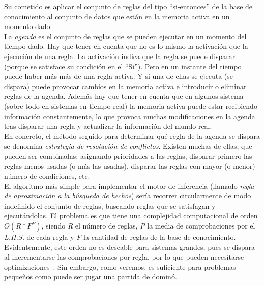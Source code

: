 Su cometido es aplicar el conjunto de reglas del tipo ``si-entonces''
de la base de conocimiento al conjunto de datos que están en la
memoria activa en un momento dado. \\

La \emph{agenda} es el conjunto de reglas que se pueden ejecutar en un
momento del tiempo dado. Hay que tener en cuenta que no es lo mismo la
activación que la ejecución de una regla. La activación indica que la
regla se puede disparar (porque se satisface su condición en el
``Si''). Pero en un instante del tiempo puede haber más más de una
regla activa. Y si una de ellas se ejecuta (se dispara) puede provocar
cambios en la memoria activa e introducir o eliminar reglas de la
agenda. Además hay que tener en cuenta que en algunos sistema (sobre
todo en sistemas en tiempo real) la memoria activa puede estar
recibiendo información constantemente, lo que provoca muchas
modificaciones en la agenda tras disparar una regla y actualizar la información del mundo real. \\

En concreto, el método seguido para determinar qué regla de la agenda
se dispara se denomina \emph{estrategia de resolución de
  conflictos}. Existen muchas de ellas, que pueden ser combinadas:
asignando prioridades a las reglas, disparar primero las reglas menos
usadas (o más las usadas), disparar las reglas con mayor (o menor)
número de condiciones, etc. \\

El algoritmo más simple para implementar el motor de inferencia
(llamado \emph{regla de aproximación a la búsqueda de hechos}) sería
recorrer circularmente de modo indefinido el conjunto de reglas,
buscando reglas que se satisfagan y ejecutándolas. El problema es que
tiene una complejidad computacional de orden $O(R*F^P)$, siendo
\emph{R} el número de reglas, \emph{P} la media de comprobaciones por
el \emph{L.H.S.} de cada regla y \emph{F} la cantidad de reglas de la
base de conocimiento. Evidentemente, este orden no es deseable para
sistemas grandes, pues se dispara al incrementarse las comprobaciones
por regla, por lo que pueden necesitarse optimizaciones~\cite{springerlink:10.1007/1155698575}. Sin embargo, como veremos, es suficiente para problemas
pequeños como puede ser jugar una partida de dominó.




